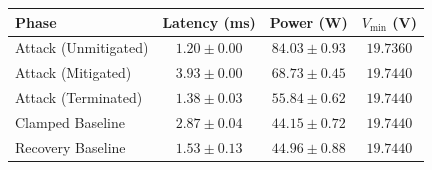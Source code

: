 \begin{tabular}{lccc}
\toprule
Phase & Latency (ms) & Power (W) & $V_{\min}$ (V) \\
\midrule
Attack (Unmitigated) & $1.20 \pm 0.00$ & $84.03 \pm 0.93$ & $19.7360$ \\
Attack (Mitigated) & $3.93 \pm 0.00$ & $68.73 \pm 0.45$ & $19.7440$ \\
Attack (Terminated) & $1.38 \pm 0.03$ & $55.84 \pm 0.62$ & $19.7440$ \\
Clamped Baseline & $2.87 \pm 0.04$ & $44.15 \pm 0.72$ & $19.7440$ \\
Recovery Baseline & $1.53 \pm 0.13$ & $44.96 \pm 0.88$ & $19.7440$ \\
\bottomrule
\end{tabular}
